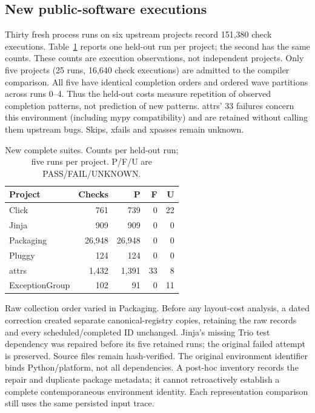\subsection{New public-software executions}
Thirty fresh process runs on six upstream projects record 151,380 check
executions. Table~\ref{tab:v11-cohort} reports one held-out run per project;
the second has the same counts. These counts are execution observations,
not independent projects. Only five projects (25 runs, 16,640 check
executions) are admitted to the compiler comparison. All five have identical
completion orders and ordered wave partitions across runs 0--4. Thus the
held-out costs measure repetition of observed completion patterns, not
prediction of new patterns. attrs' 33 failures concern this environment
(including mypy compatibility) and are retained without calling them
upstream bugs. Skips, xfails and xpasses remain unknown.

\begin{table}[t]\centering\footnotesize
\caption{New complete suites. Counts per held-out run; five runs per project.
P/F/U are PASS/FAIL/UNKNOWN.}\label{tab:v11-cohort}
\begin{tabular}{@{}lrrrr@{}}\toprule
Project & Checks & P & F & U\\\midrule
Click & 761 & 739 & 0 & 22 \\
Jinja & 909 & 909 & 0 & 0 \\
Packaging & 26,948 & 26,948 & 0 & 0 \\
Pluggy & 124 & 124 & 0 & 0 \\
attrs & 1,432 & 1,391 & 33 & 8 \\
ExceptionGroup & 102 & 91 & 0 & 11 \\
\bottomrule\end{tabular}
\end{table}

Raw collection order varied in Packaging. Before any layout-cost analysis,
a dated correction created separate canonical-registry copies, retaining
the raw records and every scheduled/completed ID unchanged. Jinja's missing
Trio test dependency was repaired before its five retained runs; the original
failed attempt is preserved. Source files remain hash-verified. The original
environment identifier binds Python/platform, not all dependencies.
A post-hoc inventory records the repair and duplicate package metadata;
it cannot retroactively establish a complete contemporaneous environment
identity. Each representation comparison still uses the same persisted
input trace.


